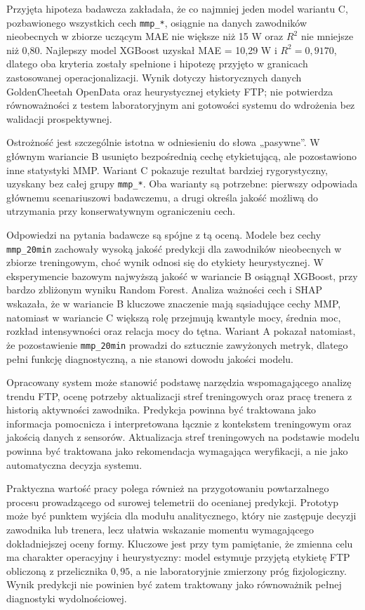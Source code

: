 Przyjęta hipoteza badawcza zakładała, że co najmniej jeden model wariantu C, pozbawionego wszystkich cech \texttt{mmp\_*}, osiągnie na danych zawodników nieobecnych w zbiorze uczącym MAE nie większe niż 15 W oraz $R^2$ nie mniejsze niż 0{,}80. Najlepszy model XGBoost uzyskał MAE = 10{,}29 W i $R^2 = 0{,}9170$, dlatego oba kryteria zostały spełnione i hipotezę przyjęto w granicach zastosowanej operacjonalizacji. Wynik dotyczy historycznych danych GoldenCheetah OpenData oraz heurystycznej etykiety FTP; nie potwierdza równoważności z testem laboratoryjnym ani gotowości systemu do wdrożenia bez walidacji prospektywnej.

Ostrożność jest szczególnie istotna w odniesieniu do słowa „pasywne”. W głównym wariancie B usunięto bezpośrednią cechę etykietującą, ale pozostawiono inne statystyki MMP. Wariant C pokazuje rezultat bardziej rygorystyczny, uzyskany bez całej grupy \texttt{mmp\_*}. Oba warianty są potrzebne: pierwszy odpowiada głównemu scenariuszowi badawczemu, a drugi określa jakość możliwą do utrzymania przy konserwatywnym ograniczeniu cech.

Odpowiedzi na pytania badawcze są spójne z tą oceną. Modele bez cechy \texttt{mmp\_20min} zachowały wysoką jakość predykcji dla zawodników nieobecnych w zbiorze treningowym, choć wynik odnosi się do etykiety heurystycznej. W eksperymencie bazowym najwyższą jakość w wariancie B osiągnął XGBoost, przy bardzo zbliżonym wyniku Random Forest. Analiza ważności cech i SHAP wskazała, że w wariancie B kluczowe znaczenie mają sąsiadujące cechy MMP, natomiast w wariancie C większą rolę przejmują kwantyle mocy, średnia moc, rozkład intensywności oraz relacja mocy do tętna. Wariant A pokazał natomiast, że pozostawienie \texttt{mmp\_20min} prowadzi do sztucznie zawyżonych metryk, dlatego pełni funkcję diagnostyczną, a nie stanowi dowodu jakości modelu.

Opracowany system może stanowić podstawę narzędzia wspomagającego analizę trendu FTP, ocenę potrzeby aktualizacji stref treningowych oraz pracę trenera z historią aktywności zawodnika. Predykcja powinna być traktowana jako informacja pomocnicza i interpretowana łącznie z kontekstem treningowym oraz jakością danych z sensorów. Aktualizacja stref treningowych na podstawie modelu powinna być traktowana jako rekomendacja wymagająca weryfikacji, a nie jako automatyczna decyzja systemu.

Praktyczna wartość pracy polega również na przygotowaniu powtarzalnego procesu prowadzącego od surowej telemetrii do ocenianej predykcji. Prototyp może być punktem wyjścia dla modułu analitycznego, który nie zastępuje decyzji zawodnika lub trenera, lecz ułatwia wskazanie momentu wymagającego dokładniejszej oceny formy. Kluczowe jest przy tym pamiętanie, że zmienna celu ma charakter operacyjny i heurystyczny: model estymuje przyjętą etykietę FTP obliczoną z przelicznika $0{,}95$, a nie laboratoryjnie zmierzony próg fizjologiczny. Wynik predykcji nie powinien być zatem traktowany jako równoważnik pełnej diagnostyki wydolnościowej.

